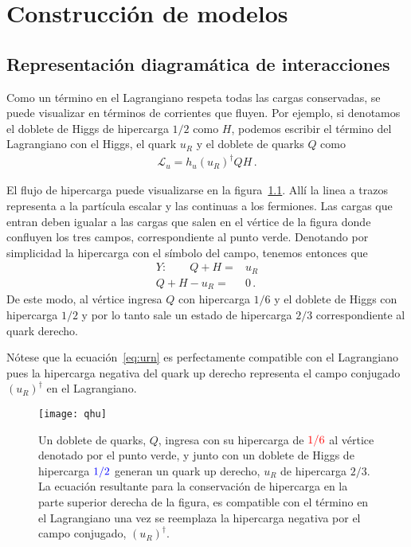 
\chapter{Construcción de modelos}

\section{Representación diagramática de interacciones}

Como un término en el Lagrangiano respeta todas las cargas conservadas,  se puede visualizar en términos de corrientes que fluyen. 
Por ejemplo, si denotamos el doblete de Higgs de hipercarga $1/2$ como
$H$, podemos escribir el término del Lagrangiano con el Higgs, el quark $u_R$ y el doblete de quarks $Q$ como
\begin{align}
  \mathcal{L}_u=h_u \left( u_R \right)^{\dagger} Q H\,. 
\end{align}

El flujo de hipercarga puede visualizarse en la figura~\ref{fig:yg}. Allí la linea a trazos representa a la partícula escalar y las continuas a los fermiones.  Las cargas que entran deben igualar a las cargas que salen en el vértice de la figura donde confluyen los tres campos, correspondiente al punto verde. Denotando por simplicidad la hipercarga con el símbolo del campo, tenemos entonces que
\begin{align}
  \label{eq:urn}
  Y:\qquad Q+H=&u_R \nonumber\\
            Q+H-u_R=&0\,.
\end{align}
De este modo, al vértice ingresa $Q$ con hipercarga $1/6$ y el doblete de Higgs con hipercarga $1/2$ y por lo tanto sale un estado de hipercarga $2/3$ correspondiente al quark derecho. 

Nótese que la  ecuación~\eqref{eq:urn} es perfectamente compatible con el Lagrangiano pues la hipercarga negativa del quark up derecho  representa el campo conjugado $\left( u_R \right)^{\dagger}$ en el Lagrangiano.

\begin{figure}
  \centering
  \texttt{[image: qhu]}
  \caption{Un doblete de quarks, $Q$, ingresa con su hipercarga de $\color{red}1/6$ al vértice denotado por el {\color{OliveGreen}punto verde}, y junto con un doblete de Higgs de hipercarga $\color{blue}1/2$ generan un quark up derecho, $u_R$ de hipercarga $2/3$. La ecuación resultante para la conservación de hipercarga en la parte superior derecha de la figura, es compatible con el término en el Lagrangiano una vez se reemplaza la hipercarga negativa por el campo conjugado, $\left( u_R \right)^{\dagger}$. }
  \label{fig:yg}
\end{figure}

